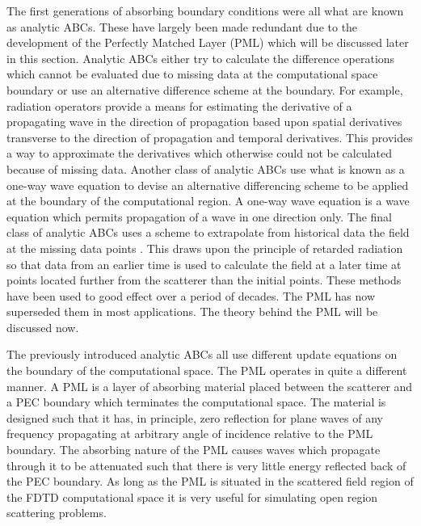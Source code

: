 \documentclass[a4paper, 12pt]{article}
\begin{document}
	The first generations of absorbing boundary conditions were all what
	are known as analytic ABCs. These have largely been made redundant due
	to the development of the Perfectly Matched Layer (PML) which will be
	discussed later in this section. Analytic ABCs either try to calculate
	the difference operations which cannot be evaluated due to missing
	data at the computational space boundary or use an alternative
	difference scheme at the boundary. For example, radiation operators
	\cite{bayliss82siamjappmath430,bayliss80commpapplmath707,higdon87mathcomp65,higdon86mathcomp437}
	provide a means for estimating the derivative of a propagating wave in
	the direction of propagation based upon spatial derivatives transverse
	to the direction of propagation and temporal derivatives. This
	provides a way to approximate the derivatives which otherwise could not
	be calculated because of missing data. Another class of analytic ABCs
	use what is known as a one-way wave equation
	\cite{engquist77mathcomp629,mur81ieeetransemc377,trefethen86mathcomp421}
	to devise an alternative differencing scheme to be applied at the
	boundary of the computational region. A one-way wave equation is a wave equation which permits
	propagation of a wave in one direction only. The final class of analytic
	ABCs uses a scheme to extrapolate from historical data the field at
	the missing data points \cite{taflove00book}. This draws upon the principle of retarded
	radiation so that data
	from an earlier time is used to calculate the field at a later time at
	points located further from the scatterer than the initial points. These
	methods have been used to good effect over a period of decades. The
	PML has now superseded them in most applications. The theory behind
	the PML will be discussed now.
	
	The previously introduced analytic ABCs all use different update
	equations on the boundary of the computational space. The PML operates
	in quite a different manner. A PML is a layer of absorbing material
	placed between the scatterer and a PEC boundary which terminates the
	computational space. The material is designed such that it has, in
	principle, zero reflection for plane waves of any frequency
	propagating at arbitrary angle of incidence relative to the PML
	boundary. The absorbing nature of the PML causes waves which
	propagate through it to be attenuated such that there is very little energy reflected
	back of the PEC boundary. As long as the PML is situated in the
	scattered field region of the FDTD computational space it is very
	useful for simulating open region scattering problems. 
	
\end{document}
